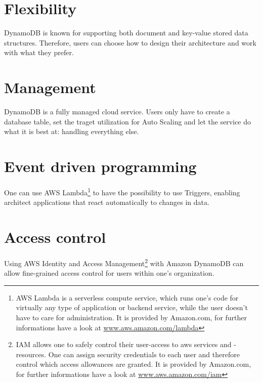 \section{Flexibility} 
		DynamoDB is known for supporting both document and key-value stored data structures. Therefore, users can choose how to design their architecture and work with what they prefer.

\section{Management} 
		DynamoDB is a fully managed cloud service. Users only have to create a database table, set the traget utilization for Auto Scaling and let the service do what it is best at: handling everything else.
		
\section{Event driven programming}  
		One can use AWS Lambda\footnote{AWS Lambda is a serverless compute service, which runs one's code for virtually any type of application or backend service, while the user doesn't have to care for administration. It is provided by Amazon.com, for further informations have a look at \href{https://aws.amazon.com/lambda/}{www.aws.amazon.com/lambda}} to have the possibility to use Triggers, enabling architect applications that react automatically to changes in data.
		
\section{Access control} 
		Using AWS Identity and Access Management\footnote{IAM allows one to safely control their user-access to aws services and -resources. One can assign security credentials to each user and therefore control which access allowances are granted. It is provided by Amazon.com, for further informations have a look at \href{https://aws.amazon.com/iam/}{www.aws.amazon.com/iam}} with Amazon DynamoDB can allow fine-grained access control for users within one's organization.
		
	













